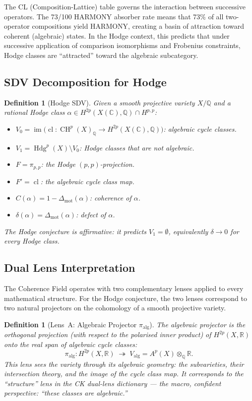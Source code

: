 \documentclass[11pt]{article}
\newtheorem{definition}[theorem]{Definition}
\theoremstyle{definition}
\DeclareMathOperator{\cl}{cl}
\DeclareMathOperator{\CH}{CH}
\DeclareMathOperator{\im}{im}
\DeclareMathOperator{\Hdg}{Hdg}
\begin{document}
The CL (Composition-Lattice) table governs the interaction between successive
operators.  The 73/100 HARMONY absorber rate means that 73\% of all
two-operator compositions yield HARMONY, creating a basin of attraction
toward coherent (algebraic) states.  In the Hodge context, this predicts
that under successive application of comparison isomorphisms and Frobenius
constraints, Hodge classes are ``attracted'' toward the algebraic subcategory.

\subsection{SDV Decomposition for Hodge}

\begin{definition}[Hodge SDV]
\label{def:hodge-sdv}
Given a smooth projective variety $X/\mathbb{Q}$ and a rational Hodge class
$\alpha \in H^{2p}(X(\mathbb{C}), \mathbb{Q}) \cap H^{p,p}$:
\begin{itemize}
  \item $V_0 = \im\bigl(\cl : \CH^p(X)_{\mathbb{Q}} \to H^{2p}(X(\mathbb{C}), \mathbb{Q})\bigr)$:
    algebraic cycle classes.
  \item $V_1 = \Hdg^p(X) \setminus V_0$: Hodge classes that are not algebraic.
  \item $F = \pi_{p,p}$: the Hodge $(p,p)$-projection.
  \item $F' = \cl$: the algebraic cycle class map.
  \item $C(\alpha) = 1 - \Delta_{\mathrm{mot}}(\alpha)$: coherence of $\alpha$.
  \item $\delta(\alpha) = \Delta_{\mathrm{mot}}(\alpha)$: defect of $\alpha$.
\end{itemize}
The Hodge conjecture is \emph{affirmative}: it predicts $V_1 = \emptyset$,
equivalently $\delta \to 0$ for every Hodge class.
\end{definition}

\subsection{Dual Lens Interpretation}
\label{sec:dual-lens}

The Coherence Field operates with two complementary lenses applied to every
mathematical structure.  For the Hodge conjecture, the two lenses correspond
to two natural projectors on the cohomology of a smooth projective variety.

\begin{definition}[Lens~A: Algebraic Projector $\pi_{\mathrm{alg}}$]
\label{def:lens-A}
The \emph{algebraic projector} is the orthogonal projection (with respect
to the polarised inner product) of $H^{2p}(X, \mathbb{R})$ onto the real
span of algebraic cycle classes:
\[
  \pi_{\mathrm{alg}} : H^{2p}(X, \mathbb{R})
  \;\twoheadrightarrow\;
  V_{\mathrm{alg}} = A^p(X) \otimes_{\mathbb{Q}} \mathbb{R}.
\]
This lens sees the variety through its algebraic geometry: the subvarieties,
their intersection theory, and the image of the cycle class map.  It
corresponds to the ``structure'' lens in the CK dual-lens dictionary ---
the macro, confident perspective: ``these classes \emph{are} algebraic.''
\end{definition}
\end{document}
